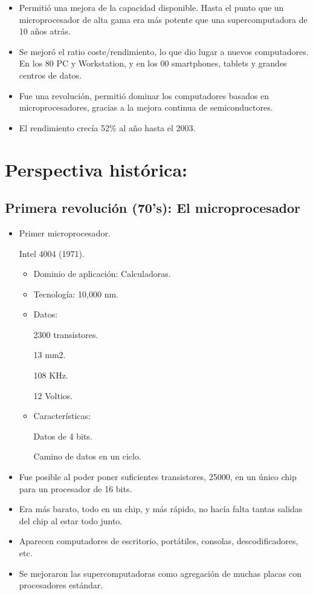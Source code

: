 \documentclass[12pt, twoside, openright]{report} %
\begin{document}
  \begin{itemize}
  
  \item
    Permitió una mejora de la capacidad disponible. Hasta el punto que
    un microprocesador de alta gama era más potente que una
    supercomputadora de 10 años atrás.
  \item
    Se mejoró el ratio coste/rendimiento, lo que dio lugar a nuevos
    computadores. En los 80 PC y Workstation, y en los 00
    smartphones, tablets y grandes centros de datos.
  \item
    Fue una revolución, permitió dominar los computadores basados en
    microprocesadores, gracias a la mejora continua de semiconductores.
  \item
    El rendimiento crecía 52\% al año hasta el 2003.
  \end{itemize}

  \section{Perspectiva histórica:}

  \subsection{Primera revolución (70's): El microprocesador}

    \begin{itemize}
    \item
      Primer microprocesador.

      Intel 4004 (1971).
      \begin{itemize}
        \item Dominio de aplicación: Calculadoras.
        \item Tecnología: 10,000 nm.
        \item Datos:

2300 transistores.

13 mm2.

108 KHz.

12 Voltios.

        \item Características:

Datos de 4 bits.

Camino de datos en un ciclo.

      \end{itemize}

    \item
      Fue posible al poder poner suficientes transistores, 25000, en un
      único chip para un procesador de 16 bits.
    \item
      Era más barato, todo en un chip, y más rápido, no hacía falta
      tantas salidas del chip al estar todo junto.
    \item
      Aparecen computadores de escritorio, portátiles, consolas,
      descodificadores, etc.
    \item
      Se mejoraron las supercomputadoras como agregación de muchas
      placas con procesadores estándar.
    \end{itemize}
  \pagebreak
\end{document}
